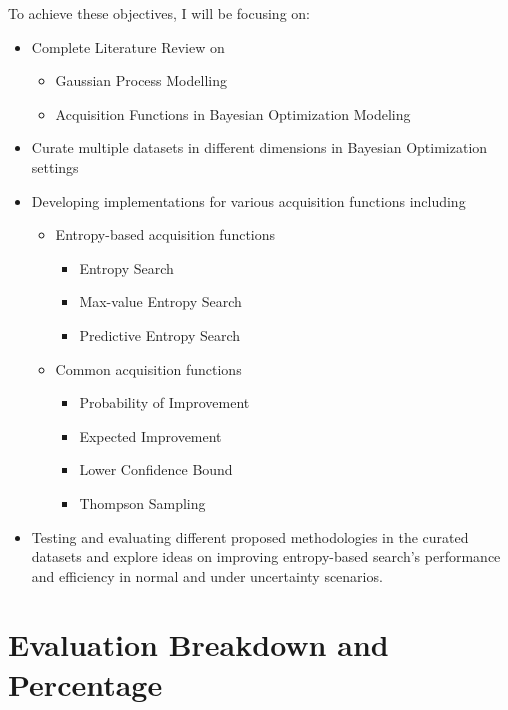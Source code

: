 \documentclass{article}
\begin{document}
To achieve these objectives, I will be focusing on:

\begin{itemize}
    \item Complete Literature Review on

    \begin{itemize}
        \item Gaussian Process Modelling
        \item Acquisition Functions in Bayesian Optimization Modeling
    \end{itemize}

    \item Curate multiple datasets in different dimensions in Bayesian Optimization settings

    \item Developing implementations for various acquisition functions including
    \begin{itemize}
        \item Entropy-based acquisition functions
        \begin{itemize}
            \item Entropy Search
            \item Max-value Entropy Search
            \item Predictive Entropy Search
        \end{itemize}

        \item Common acquisition functions
        \begin{itemize}
            \item Probability of Improvement
            \item Expected Improvement
            \item Lower Confidence Bound
            \item Thompson Sampling
        \end{itemize}
    \end{itemize}

    \item Testing and evaluating different proposed methodologies in the curated datasets and explore ideas on improving entropy-based search’s performance and efficiency in normal and under uncertainty scenarios.
\end{itemize}

\section{Evaluation Breakdown and Percentage}
\end{document}
